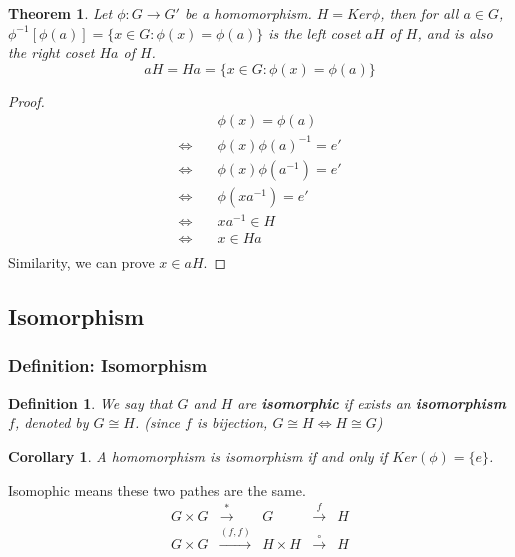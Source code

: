 \documentclass[11pt,a4paper]{article}
\newtheorem{theorem}{Theorem}
\newtheorem{corollary}{Corollary}
\newtheorem{definition}{Definition}
\begin{document}
\begin{theorem}
Let $\phi: G \rightarrow G'$ be a homomorphism. $H=Ker\phi$, then for all $a\in G$, $\phi^{-1}[\phi(a)]=\{x\in G:\phi(x)=\phi(a)\}$ is the left coset $aH$ of $H$, and is also the right coset $Ha$ of $H$.
$$aH=Ha=\{x\in G:\phi(x)=\phi(a)\}$$
\end{theorem}
\begin{proof}
\begin{equation}
    \begin{aligned}
        &\phi(x)=\phi(a)\\
        \Leftrightarrow\quad	&\phi(x)\phi(a)^{-1}=e'\\
        \Leftrightarrow\quad	&\phi(x)\phi(a^{-1})=e'\\
        \Leftrightarrow\quad	&\phi(xa^{-1})=e'\\
        \Leftrightarrow\quad	&xa^{-1}\in H\\
        \Leftrightarrow\quad	&x\in Ha\\
    \end{aligned}
    \nonumber
\end{equation}
Similarity, we can prove $x\in aH$.
\end{proof}

\subsection{Isomorphism}
\subsubsection{Definition: Isomorphism}
\begin{definition}
    We say that $G$ and $H$ are \textbf{isomorphic} if exists an \textbf{isomorphism} $f$, denoted by $G\cong H$. (since $f$ is bijection, $G\cong H\Leftrightarrow H\cong G$)
\end{definition}
\begin{corollary}
A homomorphism is isomorphism if and only if $Ker(\phi)=\{e\}$.
\end{corollary}

Isomophic means these two pathes are the same.
\begin{equation}
    \begin{aligned}
        G\times G& \stackrel{*}{\longrightarrow} & G &\stackrel{f}{\longrightarrow}& H\\
        G\times G& \stackrel{(f,f)}{\longrightarrow} &H\times H & \stackrel{\circ}{\longrightarrow}& H\\
    \end{aligned}
    \nonumber
\end{equation}
\end{document}
